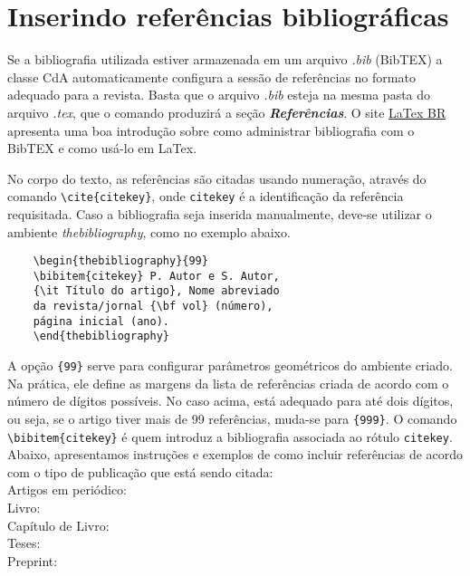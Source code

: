 \documentclass{article}
\begin{document}
\section*{Inserindo referências bibliográficas}
Se a bibliografia utilizada estiver armazenada em um arquivo \textit{.bib} (BibTEX) a classe CdA automaticamente configura a sessão de referências no formato adequado para a revista. Basta que o arquivo \textit{.bib} esteja na mesma pasta do arquivo \textit{.tex}, que o comando \verb|| produzirá a seção \textit{\textbf{Referências}}. O site \href{http://latexbr.blogspot.com/2012/09/bibliografia-com-bibtex.html}{LaTex BR} apresenta uma boa introdução sobre como administrar bibliografia com o BibTEX e como usá-lo em LaTex.

No corpo do texto, as referências são citadas usando numeração, através do comando \verb|\cite{citekey}|, onde \verb|citekey| é a identificação da referência requisitada. Caso a bibliografia seja inserida manualmente, deve-se utilizar o ambiente \textit{thebibliography}, como no exemplo abaixo.
\begin{verbatim}
	\begin{thebibliography}{99}
	\bibitem{citekey} P. Autor e S. Autor,
	{\it Título do artigo},	Nome abreviado
	da revista/jornal {\bf vol} (número),
	página inicial (ano).
	\end{thebibliography}
\end{verbatim}
A opção \verb|{99}| serve para configurar parâmetros geométricos do ambiente criado. Na prática, ele define as margens da lista de referências criada de acordo com o número de dígitos possíveis. No caso acima, está adequado para até dois dígitos, ou seja, se o artigo tiver mais de 99 referências, muda-se para \verb|{999}|. O comando \verb|\bibitem{citekey}| é quem introduz a bibliografia associada ao rótulo \verb|citekey|.
Abaixo, apresentamos instruções e exemplos de como incluir referências de acordo com o tipo de publicação que está sendo citada:\\
Artigos em periódico: \cite{CdA:art,Fabris:2009wa}\\
Livro: \cite{CdA:livro,Weinberg1972gcpa}\\
Capítulo de Livro: \cite{CdA:proc,Toniato:2016sma}\\
Teses: \cite{CdA:tese,Clifton:2006jh}\\
Preprint: \cite{CdA:preprint,jimnez2020anisotropic}


{} 
\end{document}
